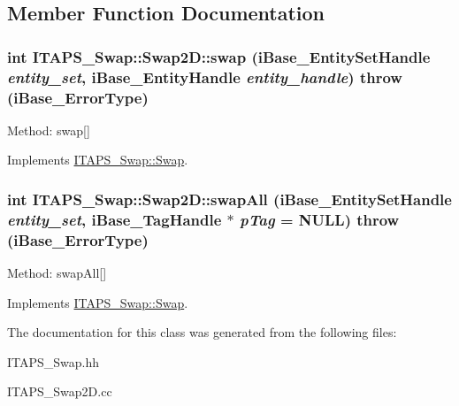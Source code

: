 \subsection{Member Function Documentation}
\hypertarget{class_i_t_a_p_s___swap_1_1_swap2_d_a84a78678e5e830d16c725a93f3b5038f}{
\subsubsection[{swap}]{\setlength{\rightskip}{0pt plus 5cm}int ITAPS\_\-Swap::Swap2D::swap (iBase\_\-EntitySetHandle {\em entity\_\-set}, \/  iBase\_\-EntityHandle {\em entity\_\-handle})  throw (iBase\_\-ErrorType)}}
\label{class_i_t_a_p_s___swap_1_1_swap2_d_a84a78678e5e830d16c725a93f3b5038f}
Method: swap\mbox{[}\mbox{]} 

Implements \hyperlink{class_i_t_a_p_s___swap_1_1_swap_adfb444f7ade3254ba8fa9ced2ec15e65}{ITAPS\_\-Swap::Swap}.

\hypertarget{class_i_t_a_p_s___swap_1_1_swap2_d_a4bee7d3a08e3ff6ac85a81ec321479ef}{
\subsubsection[{swapAll}]{\setlength{\rightskip}{0pt plus 5cm}int ITAPS\_\-Swap::Swap2D::swapAll (iBase\_\-EntitySetHandle {\em entity\_\-set}, \/  iBase\_\-TagHandle $\ast$ {\em pTag} = {\ttfamily NULL})  throw (iBase\_\-ErrorType)}}
\label{class_i_t_a_p_s___swap_1_1_swap2_d_a4bee7d3a08e3ff6ac85a81ec321479ef}
Method: swapAll\mbox{[}\mbox{]} 

Implements \hyperlink{class_i_t_a_p_s___swap_1_1_swap_a8a1fdc1a12fb71dfe28881b10277eafc}{ITAPS\_\-Swap::Swap}.



The documentation for this class was generated from the following files:\begin{DoxyCompactItemize}
\item 
ITAPS\_\-Swap.hh\item 
ITAPS\_\-Swap2D.cc\end{DoxyCompactItemize}
